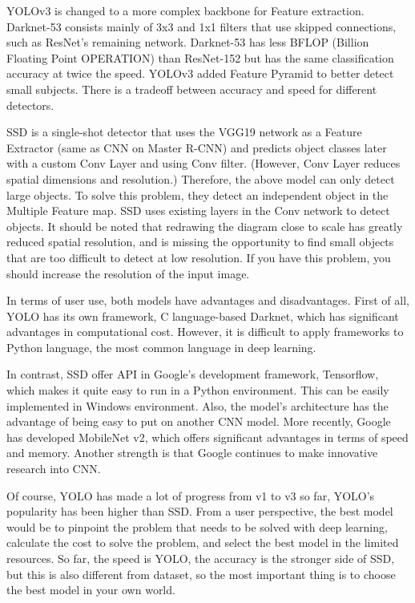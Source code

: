 \documentclass{ieeeaccess}
\begin{document}
YOLOv3 is changed to a more complex backbone for Feature extraction. Darknet-53 consists mainly of 3x3 and 1x1 filters that use skipped connections, such as ResNet's remaining network. Darknet-53 has less BFLOP (Billion Floating Point OPERATION) than ResNet-152 but has the same classification accuracy at twice the speed. YOLOv3 added Feature Pyramid to better detect small subjects. There is a tradeoff between accuracy and speed for different detectors.

SSD is a single-shot detector that uses the VGG19 network as a Feature Extractor (same as CNN on Master R-CNN) and predicts object classes later with a custom Conv Layer and using Conv filter. (However, Conv Layer reduces spatial dimensions and resolution.) Therefore, the above model can only detect large objects. To solve this problem, they detect an independent object in the Multiple Feature map. SSD uses existing layers in the Conv network to detect objects. It should be noted that redrawing the diagram close to scale has greatly reduced spatial resolution, and is missing the opportunity to find small objects that are too difficult to detect at low resolution. If you have this problem, you should increase the resolution of the input image.

In terms of user use, both models have advantages and disadvantages. First of all, YOLO has its own framework, C language-based Darknet, which has significant advantages in computational cost. However, it is difficult to apply frameworks to Python language, the most common language in deep learning.

In contrast, SSD offer API in Google's development framework, Tensorflow, which makes it quite easy to run in a Python environment. This can be easily implemented in Windows environment. Also, the model's architecture has the advantage of being easy to put on another CNN model. More recently, Google has developed MobileNet v2, which offers significant advantages in terms of speed and memory. Another strength is that Google continues to make innovative research into CNN.

Of course, YOLO has made a lot of progress from v1 to v3 so far, YOLO's popularity has been higher than SSD. From a user perspective, the best model would be to pinpoint the problem that needs to be solved with deep learning, calculate the cost to solve the problem, and select the best model in the limited resources. So far, the speed is YOLO, the accuracy is the stronger side of SSD, but this is also different from dataset, so the most important thing is to choose the best model in your own world.
\end{document}
